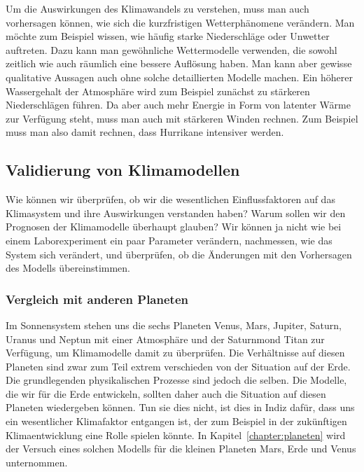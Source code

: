 Um die Auswirkungen des Klimawandels zu verstehen, muss man auch
vorhersagen können, wie sich die kurzfristigen Wetterphänomene
verändern.
Man möchte zum Beispiel wissen, wie häufig starke Niederschläge oder
Unwetter auftreten.
Dazu kann man gewöhnliche Wettermodelle verwenden, die sowohl zeitlich
wie auch räumlich eine bessere Auflösung haben.
Man kann aber gewisse qualitative Aussagen auch ohne solche
detaillierten Modelle machen.
Ein höherer Wassergehalt der Atmosphäre wird zum Beispiel zunächst
zu stärkeren Niederschlägen führen.
Da aber auch mehr Energie in Form von latenter Wärme zur Verfügung
steht, muss man auch mit stärkeren Winden rechnen.
Zum Beispiel muss man also damit rechnen, dass Hurrikane intensiver
werden.

\subsection{Validierung von Klimamodellen}
Wie können wir überprüfen, ob wir die wesentlichen Einflussfaktoren
auf das Klimasystem und ihre Auswirkungen verstanden haben?
Warum sollen wir den Prognosen der Klimamodelle überhaupt glauben?
Wir können ja nicht wie bei einem Laborexperiment ein paar Parameter
verändern, nachmessen, wie das System sich verändert, und überprüfen,
ob die Änderungen mit den Vorhersagen des Modells übereinstimmen.

\subsubsection{Vergleich mit anderen Planeten}
Im Sonnensystem stehen uns die sechs Planeten Venus,
%
%
%
%
%
%
Mars, Jupiter, Saturn, Uranus und Neptun mit einer Atmosphäre und
der Saturnmond Titan zur Verfügung, um Klimamodelle damit zu überprüfen.
%
Die Verhältnisse auf diesen Planeten sind zwar zum Teil extrem verschieden
von der Situation auf der Erde.
Die grundlegenden physikalischen Prozesse sind jedoch die selben.
Die Modelle, die wir für die Erde entwickeln, sollten daher auch
die Situation auf diesen Planeten wiedergeben können.
Tun sie dies nicht, ist dies in Indiz dafür, dass uns ein wesentlicher 
Klimafaktor entgangen ist, der zum Beispiel in der zukünftigen Klimaentwicklung
eine Rolle spielen könnte.
In Kapitel~\ref{chapter:planeten} wird der Versuch eines solchen Modells
für die kleinen Planeten Mars, Erde und Venus unternommen.

